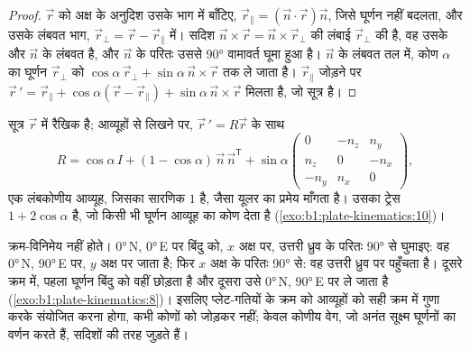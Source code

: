 \begin{proof}
$\vec r$ को अक्ष के अनुदिश उसके भाग में बाँटिए, $\vec r_\parallel =
(\vec n\cdot\vec r)\vec n$, जिसे घूर्णन नहीं बदलता, और उसके लंबवत भाग, $\vec r_\perp = \vec r - \vec r_\parallel$ में। सदिश $\vec n\times\vec r = \vec n\times\vec r_\perp$ की लंबाई $\vec r_\perp$ की है, वह उसके और $\vec n$ के लंबवत है, और $\vec n$ के परितः उससे \ang{90} वामावर्त घूमा हुआ है। 
$\vec n$ के लंबवत तल में, कोण $\alpha$ का घूर्णन $\vec r_\perp$ को $\cos\alpha\,\vec r_\perp +
\sin\alpha\,\vec n\times\vec r$ तक ले जाता है। $\vec r_\parallel$ जोड़ने पर $\vec r\,' =
\vec r_\parallel + \cos\alpha(\vec r - \vec r_\parallel) + \sin\alpha\,
\vec n\times\vec r$ मिलता है, जो सूत्र है।
\end{proof}

सूत्र $\vec r$ में रैखिक है; आव्यूहों से लिखने पर, $\vec r\,' = R\vec r$ के साथ
\[
  R = \cos\alpha\,I + (1 - \cos\alpha)\,\vec n\,\vec n^{\mathsf T}
  + \sin\alpha
  \begin{pmatrix} 0 & -n_z & n_y\\ n_z & 0 & -n_x\\ -n_y & n_x & 0\end{pmatrix},
\]
एक लंबकोणीय आव्यूह, जिसका सारणिक $1$ है, जैसा यूलर का प्रमेय माँगता है। उसका ट्रेस $1 + 2\cos\alpha$ है, जो किसी भी घूर्णन आव्यूह का कोण देता है
(\cref{exo:b1:plate-kinematics:10})।

 क्रम-विनिमेय नहीं होते। \ang{0}\,N, \ang{0}\,E पर बिंदु को, $x$ अक्ष पर, उत्तरी ध्रुव के परितः \ang{90} से घुमाइए: वह \ang{0}\,N, \ang{90}\,E पर, $y$ अक्ष पर जाता है; फिर $x$ अक्ष के परितः \ang{90} से: वह उत्तरी ध्रुव पर पहुँचता है। दूसरे क्रम में, पहला घूर्णन बिंदु को वहीं छोड़ता है और दूसरा उसे \ang{0}\,N, \ang{90}\,E पर ले जाता है (\cref{exo:b1:plate-kinematics:8})। इसलिए प्लेट-गतियों के क्रम को आव्यूहों को सही क्रम में गुणा करके संयोजित करना होगा, कभी कोणों को जोड़कर नहीं; केवल कोणीय वेग, जो अनंत सूक्ष्म घूर्णनों का वर्णन करते हैं, सदिशों की तरह जुड़ते हैं।

